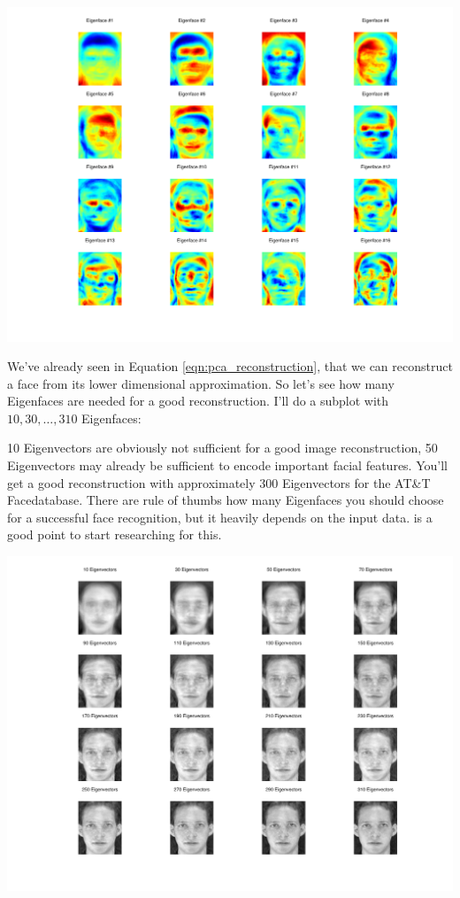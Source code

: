 \begin{center}
	\includegraphics[scale=0.6]{img/eigenfaces/pca_eigenfaces}
\end{center}

We've already seen in Equation \ref{eqn:pca_reconstruction}, that we can reconstruct a face from its lower dimensional approximation. So let's see how many Eigenfaces are needed for a good reconstruction. I'll do a subplot with $10,30,\ldots,310$ Eigenfaces:



10 Eigenvectors are obviously not sufficient for a good image reconstruction, 50 Eigenvectors may already be sufficient to encode important facial features. You'll get a good reconstruction with approximately 300 Eigenvectors for the AT\&T Facedatabase. There are rule of thumbs how many Eigenfaces you should choose for a successful face recognition, but it heavily depends on the input data. \cite{zhao2003frl} is a good point to start researching for this.

\begin{center}
	\includegraphics[scale=0.6]{img/eigenfaces/pca_reconstruction}
\end{center}

